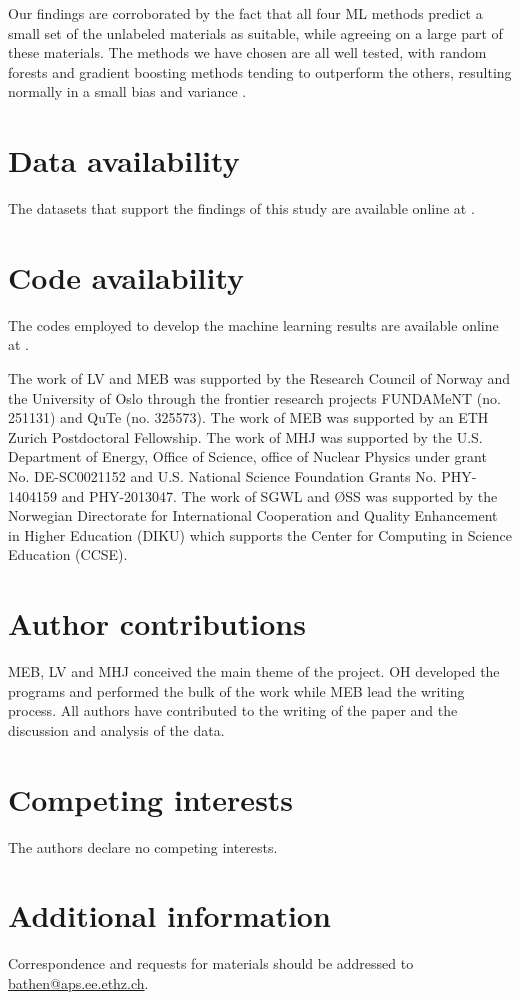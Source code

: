 \documentclass[superscriptaddress,
preprint,
 amsmath,amssymb,
 aps,
]{revtex4-2}
\newcommand{\mrk}[1]{\textcolor{red}{#1}}
\begin{document}
Our findings are corroborated by the fact that all four ML methods predict a small set of the unlabeled materials as suitable, while agreeing on a large part of these materials. 
The methods we have chosen are all well tested, with random forests and gradient boosting methods tending to outperform the others, resulting normally in a small bias and variance \cite{Hastie2009,Mehta2019,Murphy2012}.

\section*{Data availability} 
The datasets that support the findings of this study are available online at \cite{Ohebbi2021}.

\section*{Code availability} 
The codes employed to develop the machine learning results are available online at \cite{Ohebbi2021}. 


\begin{acknowledgments}

The work of LV and MEB was supported by the Research Council of Norway and the University of Oslo through the frontier research projects FUNDAMeNT (no. 251131) and QuTe (no. 325573). 
The work of MEB was supported by an ETH Zurich Postdoctoral Fellowship. 
The work of MHJ was supported by the U.S. Department of Energy, 
Office of Science, office of Nuclear Physics under grant 
No. DE-SC0021152 and U.S. National Science Foundation Grants
No. PHY-1404159 and PHY-2013047. 
The work of SGWL and ØSS was supported by the Norwegian Directorate for International Cooperation and Quality Enhancement in Higher Education (DIKU) which supports the Center for Computing in Science Education (CCSE).


\end{acknowledgments}



\section*{Author contributions}
MEB, LV and MHJ conceived the main theme of the project. OH developed the programs and performed the bulk of the work while MEB lead the writing process. All authors have contributed to the writing of the paper and the discussion and analysis of the data.


\section*{Competing interests}
The authors declare no competing interests.





\section*{Additional information}
Correspondence and requests for materials should be addressed to
\mrk{\href{mailto:bathen@aps.ee.ethz.ch}{bathen@aps.ee.ethz.ch}}.


\listoffigures
\end{document}
